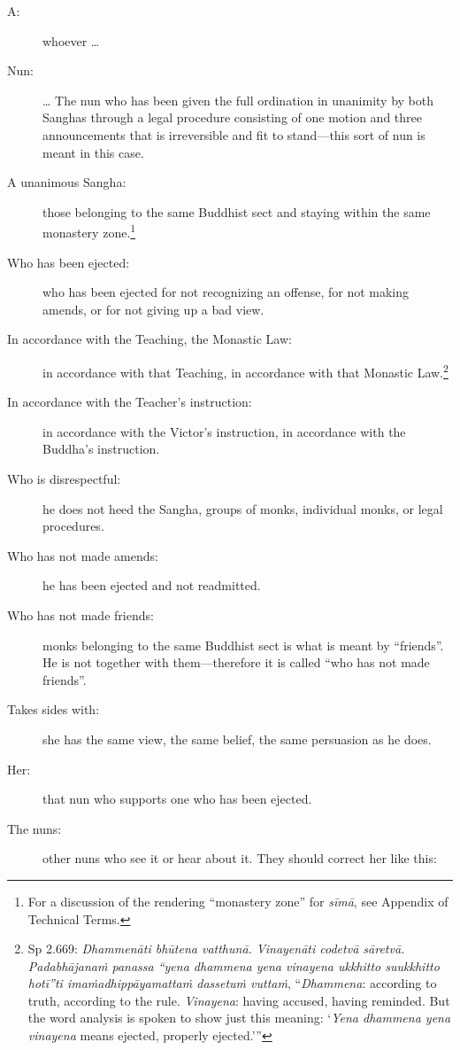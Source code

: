 \documentclass[12pt,openany]{book}%
\begin{document}
\begin{description}%
\item[A: ] whoever … %
\item[Nun: ] … The nun who has been given the full ordination in unanimity by both Sanghas through a legal procedure consisting of one motion and three announcements that is irreversible and fit to stand—this sort of nun is meant in this case. %
\item[A unanimous Sangha: ] those belonging to the same Buddhist sect and staying within the same monastery zone.\footnote{For a discussion of the rendering “monastery zone” for \textit{\textsanskrit{sīmā}}, see Appendix of Technical Terms. } %
\item[Who has been ejected: ] who has been ejected for not recognizing an offense, for not making amends, or for not giving up a bad view. %
\item[In accordance with the Teaching, the Monastic Law: ] in accordance with that Teaching, in accordance with that Monastic Law.\footnote{Sp 2.669: \textit{\textsanskrit{Dhammenāti} \textsanskrit{bhūtena} \textsanskrit{vatthunā}. \textsanskrit{Vinayenāti} \textsanskrit{codetvā} \textsanskrit{sāretvā}. \textsanskrit{Padabhājanaṁ} panassa “yena dhammena yena vinayena ukkhitto suukkhitto \textsanskrit{hotī}”ti \textsanskrit{imaṁadhippāyamattaṁ} \textsanskrit{dassetuṁ} \textsanskrit{vuttaṁ}}, “\textit{Dhammena}: according to truth, according to the rule. \textit{Vinayena}: having accused, having reminded. But the word analysis is spoken to show just this meaning: ‘\textit{Yena dhammena yena vinayena} means ejected, properly ejected.’” } %
\item[In accordance with the Teacher’s instruction: ] in accordance with the Victor’s instruction, in accordance with the Buddha’s instruction. %
\item[Who is disrespectful: ] he does not heed the Sangha, groups of monks, individual monks, or legal procedures. %
\item[Who has not made amends: ] he has been ejected and not readmitted. %
\item[Who has not made friends: ] monks belonging to the same Buddhist sect is what is meant by “friends”. He is not together with them—therefore it is called “who has not made friends”. %
\item[Takes sides with: ] she has the same view, the same belief, the same persuasion as he does. %
\item[Her: ] that nun who supports one who has been ejected. %
\item[The nuns: ] other nuns who see it or hear about it. They should correct her like this: 


\end{description}
\end{document}
